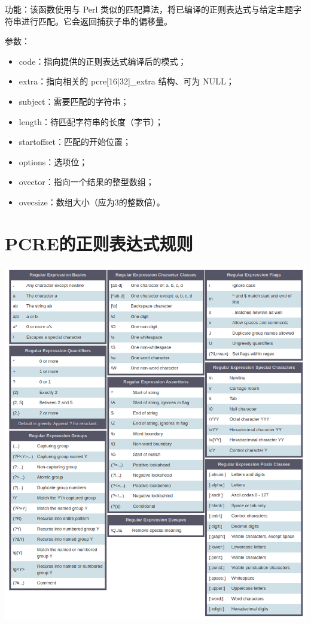 功能：该函数使用与 Perl 类似的匹配算法，将已编译的正则表达式与给定主题字符串进行匹配。它会返回捕获子串的偏移量。

参数：
\begin{itemize}
\item code：指向提供的正则表达式编译后的模式；
\item extra：指向相关的 pcre[16|32]\_extra 结构、可为 NULL；
\item subject：需要匹配的字符串；
\item length：待匹配字符串的长度（字节）；
\item startoffset：匹配的开始位置；
\item options：选项位；
\item ovector：指向一个结果的整型数组；
\item ovecsize：数组大小（应为3的整数倍）。
\end{itemize}


\chapter{PCRE的正则表达式规则}
\begin{center}
\includegraphics[width=\textwidth]{images/pcre.png}
\end{center}


